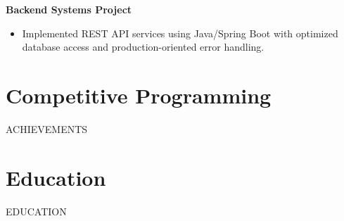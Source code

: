 \documentclass[10pt]{article}
\begin{document}
\textbf{Backend Systems Project}\\
\begin{itemize}
\item Implemented REST API services using Java/Spring Boot with optimized database access and production-oriented error handling.
\end{itemize}

\section*{Competitive Programming}
{{ACHIEVEMENTS}}

\section*{Education}
{{EDUCATION}}
\end{document}

